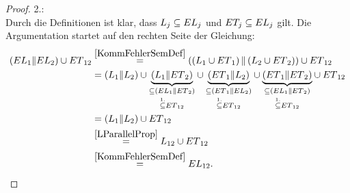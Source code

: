 \begin{proof}
  2.:\\
  Durch die Definitionen ist klar, dass $L_j\subseteq EL _j$ und $ET
  _j\subseteq EL _j$ gilt. Die Argumentation startet auf den rechten Seite der
  Gleichung:
  \begin{align*}
    (EL{}_1\| EL{}_2)\cup
    ET{}_{12}&\overset{\ref{KommFehlerSemDef}}{=}\left(\left(L_1\cup
    ET{}_1\right)\|\left(L_2\cup ET{}_2\right)\right)\cup ET{}_{12}\\
    &=(L_1\|L_2) \cup \underset{\overset{1.}{\subseteq}
    ET{}_{12}}{\underset{\subseteq
    (EL{}_1\|ET{}_2)}{\underbrace{(L_1\|ET{}_2)}}} \cup
    \underset{\overset{1.}{\subseteq} ET{}_{12}}{\underset{\subseteq
    (ET{}_1\|EL{}_2)}{\underbrace{(ET{}_1\|L_2)}}} \cup
    \underset{\overset{1.}{\subseteq} ET{}_{12}}{\underset{\subseteq
    (EL{}_1\|ET{}_2)}{\underbrace{(ET{}_1\|ET{}_2)}}} \cup ET{}_{12}\\
    &=(L_1\|L_2) \cup ET{}_{12}\\
    &\overset{\ref{LParallelProp}}{=}L_{12}\cup ET{}_{12}\\
    &\overset{\ref{KommFehlerSemDef}}{=}EL{}_{12}.
  \end{align*}
\end{proof}

